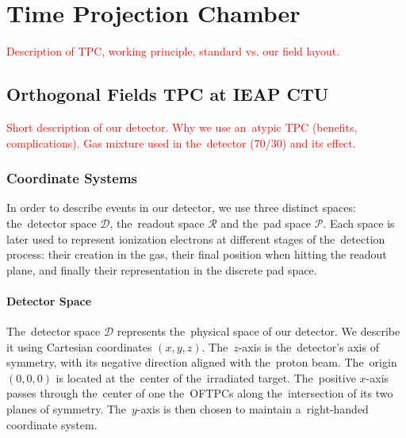 \chapter{Time Projection Chamber}
\label{sec:tpc}
	\textcolor{red}{Description of TPC, working principle, standard vs. our field layout.}
	
	\section{Orthogonal Fields TPC at IEAP CTU}
	\label{sec:oftpc}
		\textcolor{red}{Short description of our detector. Why we use an~atypic TPC (benefits, complications). Gas mixture used in the~detector (70/30) and its effect.}
	
	\subsection{Coordinate Systems}
	\label{sec:coor}
		In order to describe events in our detector, we use three distinct spaces: the~detector space $\mathcal{D}$, the~readout space $\mathcal{R}$ and the~pad space $\mathcal{P}$. Each space is later used to represent ionization electrons at different stages of the~detection process: their creation in the gas, their final position when hitting the readout plane, and finally their representation in the discrete pad space.
	
	\subsubsection{Detector Space}
		The~detector space $\mathcal{D}$ represents the~physical space of our detector. We describe it using Cartesian coordinates $(x,y,z)$. The~$z$-axis is the~detector's axis of symmetry, with its negative direction aligned with the~proton beam. The~origin $(0,0,0)$ is located at the~center of the~irradiated target. The~positive $x$\nobreakdash-axis passes through the~center of one the~\ac{OFTPC}s along the~intersection of its two planes of symmetry. The~$y$\nobreakdash-axis is then chosen to maintain a~right-handed coordinate system.
		
